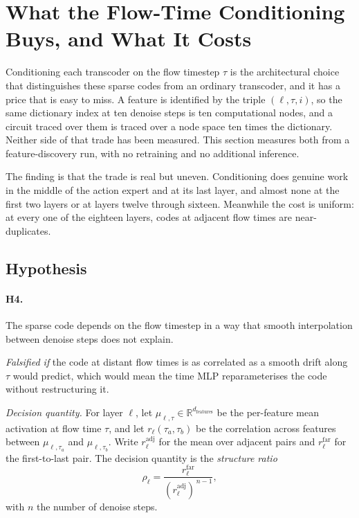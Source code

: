 
\providecommand{\RESULT}[1]{\textbf{[#1]}}

\section{What the Flow-Time Conditioning Buys, and What It Costs}
\label{sec:tau}

Conditioning each transcoder on the flow timestep $\tau$ is the architectural
choice that distinguishes these sparse codes from an ordinary transcoder, and
it has a price that is easy to miss. A feature is identified by the triple
$(\ell,\tau,i)$, so the same dictionary index at ten denoise steps is ten
computational nodes, and a circuit traced over them is traced over a node space
ten times the dictionary. Neither side of that trade has been measured. This
section measures both from a feature-discovery run, with no retraining and no
additional inference.

The finding is that the trade is real but uneven. Conditioning does genuine
work in the middle of the action expert and at its last layer, and almost none
at the first two layers or at layers twelve through sixteen. Meanwhile the cost
is uniform: at every one of the eighteen layers, codes at adjacent flow times
are near-duplicates.

\subsection{Hypothesis}

\paragraph{H4.} The sparse code depends on the flow timestep in a way that
smooth interpolation between denoise steps does not explain.

\emph{Falsified if} the code at distant flow times is as correlated as a smooth
drift along $\tau$ would predict, which would mean the time MLP reparameterises
the code without restructuring it.

\emph{Decision quantity.} For layer $\ell$, let $\mu_{\ell,\tau}\in\mathbb{R}^{d_{\mathrm{features}}}$
be the per-feature mean activation at flow time $\tau$, and let
$r_{\ell}(\tau_a,\tau_b)$ be the correlation across features between
$\mu_{\ell,\tau_a}$ and $\mu_{\ell,\tau_b}$. Write $r^{\mathrm{adj}}_{\ell}$ for
the mean over adjacent pairs and $r^{\mathrm{far}}_{\ell}$ for the first-to-last
pair. The decision quantity is the \emph{structure ratio}
\begin{equation}
\rho_{\ell}
=
\frac{r^{\mathrm{far}}_{\ell}}
     {\left(r^{\mathrm{adj}}_{\ell}\right)^{\,n-1}},
\label{eq:tau-structure}
\end{equation}
with $n$ the number of denoise steps.

